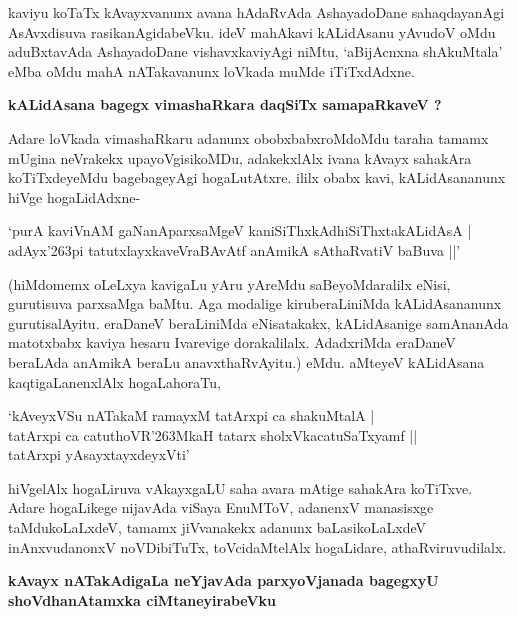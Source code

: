 kaviyu koTaTx kAvayxvanunx avana hAdaRvAda AshayadoDane sahaqdayanAgi AsAvxdisuva rasikanAgidabeVku. ideV mahAkavi kALidAsanu yAvudoV oMdu aduBxtavAda AshayadoDane vishavxkaviyAgi niMtu, `aBijAcnxna shAkuMtala' eMba oMdu mahA nATakavanunx loVkada muMde iTiTxdAdxne.

\noindent
{\bf\large{kALidAsana bagegx vimashaRkara daqSiTx samapaRkaveV ?}}

Adare loVkada vimashaRkaru adanunx obobxbabxroMdoMdu taraha tamamx mUgina neVrakekx upayoVgisikoMDu, adakekxlAlx ivana kAvayx sahakAra koTiTxdeyeMdu bagebageyAgi hogaLutAtxre. ililx obabx kavi, kALidAsananunx hiVge hogaLidAdxne-

\begin{shloka}
`purA kaviVnAM gaNanAparxsaMgeV kaniSiThxkAdhiSiThxtakALidAsA |\\\label{233}
adAyx\char'263pi tatutxlayxkaveVraBAvAtf anAmikA sAthaRvatiV baBuva ||'
\end{shloka}

(hiMdomemx oLeLxya kavigaLu yAru yAreMdu saBeyoMdaralilx eNisi, gurutisuva parxsaMga baMtu. Aga modalige kiruberaLiniMda kALidAsananunx gurutisalAyitu. eraDaneV beraLiniMda eNisatakakx, kALidAsanige samAnanAda matotxbabx kaviya hesaru Ivarevige dorakalilalx. AdadxriMda eraDaneV beraLAda anAmikA beraLu anavxthaRvAyitu.) eMdu. aMteyeV kALidAsana kaqtigaLanenxlAlx hogaLahoraTu,

\begin{shloka}
`kAveyxVSu nATakaM ramayxM tatArxpi ca shakuMtalA |\\\label{233}
tatArxpi ca catuthoVR\char'263MkaH tatarx sholxVkacatuSaTxyamf ||\\
tatArxpi yAsayxtayxdeyxVti'
\end{shloka}

hiVgelAlx hogaLiruva vAkayxgaLU saha avara mAtige sahakAra koTiTxve. Adare hogaLikege nijavAda viSaya EnuMToV, adanenxV manasisxge taMdukoLaLxdeV, tamamx jiVvanakekx adanunx baLasikoLaLxdeV inAnxvudanonxV noVDibiTuTx, toVcidaMtelAlx hogaLidare, athaRviruvudilalx.

\noindent
{\bf\large{kAvayx nATakAdigaLa neYjavAda parxyoVjanada bagegxyU shoVdhanAtamxka ciMtaneyirabeVku}}\label{page250}

